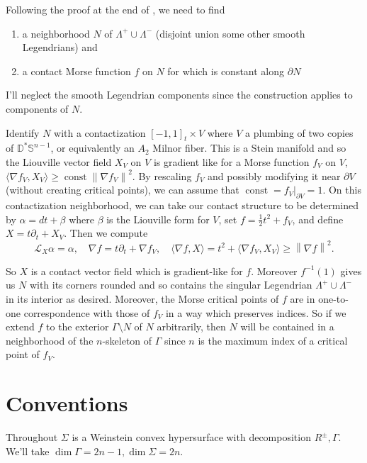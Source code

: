 \documentclass[11pt]{amsart}
\DeclareMathOperator{\const}{const}
\newcommand{\disk}{\mathbb{D}}
\newcommand{\grad}{\nabla}
\newcommand{\Lie}{\mathcal{L}}
\newcommand{\half}{\frac{1}{2}}
\newcommand{\be}{\begin{enumerate}}
\newcommand{\ee}{\end{enumerate}}
\newcommand{\norm}[1]{\left\lVert#1\right\rVert}
\newcommand{\sphere}{\mathbb{S}}
\newcommand{\hypersurface}{\Sigma}
\newcommand{\posNegRegion}{R^{\pm}}
\newcommand{\Leg}{\Lambda}
\newcommand{\posLeg}{\Leg^{+}}
\newcommand{\negLeg}{\Leg^{-}}
\newcommand{\divSet}{\Gamma}
\begin{document}
Following the proof at the end of \cite[\S 10]{HH:Convex}, we need to find 
\be
\item a neighborhood $N$ of $\posLeg \cup \negLeg$ (disjoint union some other smooth Legendrians) and
\item a contact Morse function $f$ on $N$ for which is constant along $\partial N$
\ee
I'll neglect the smooth Legendrian components since the construction applies to components of $N$.

Identify $N$ with a contactization $[-1, 1]_{t} \times V$ where $V$ a plumbing of two copies of $\disk^{\ast}\sphere^{n-1}$, or equivalently an $A_{2}$ Milnor fiber. This is a Stein manifold and so the Liouville vector field $X_{V}$ on $V$ is gradient like for a Morse function $f_{V}$ on $V$, $\langle \grad f_{V}, X_{V} \rangle \geq \const \norm{ \grad f_{V}}^{2}$. By rescaling $f_{V}$ and possibly modifying it near $\partial V$ (without creating critical points), we can assume that $\const = f_{V}|_{\partial V} = 1$. On this contactization neighborhood, we can take our contact structure to be determined by $\alpha = dt + \beta$ where $\beta$ is the Liouville form for $V$, set $f = \half t^{2} + f_{V}$, and define $X = t\partial_{t} + X_{V}$. Then we compute
\begin{equation*}
\Lie_{X}\alpha = \alpha, \quad \grad f = t\partial_{t} + \grad f_{V}, \quad \langle \grad f, X\rangle = t^{2} + \langle \grad f_{V}, X_{V} \rangle \geq \norm{\grad f}^{2}.
\end{equation*}

So $X$ is a contact vector field which is gradient-like for $f$. Moreover $f^{-1}(1)$ gives us $N$ with its corners rounded and so contains the singular Legendrian $\posLeg \cup \negLeg$ in its interior as desired. Moreover, the Morse critical points of $f$ are in one-to-one correspondence with those of $f_{V}$ in a way which preserves indices. So if we extend $f$ to the exterior $\divSet \setminus N$ of $N$ arbitrarily, then $N$ will be contained in a neighborhood of the $n$-skeleton of $\divSet$ since $n$ is the maximum index of a critical point of $f_{V}$.

\section{Conventions}

Throughout $\hypersurface$ is a Weinstein convex hypersurface with decomposition $\posNegRegion, \divSet$. We'll take $\dim \divSet = 2n-1, \dim \hypersurface = 2n$.
\end{document}
